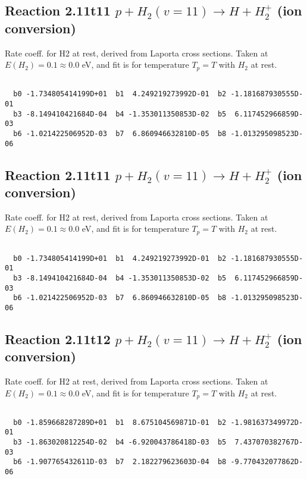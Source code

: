 \newpage
\subsection{
Reaction 2.11t11
$ p + H_2(v=11) \rightarrow H + H_2^+$ (ion conversion)
}
Rate coeff. for H2 at rest, derived from Laporta cross sections.
Taken at $E(H_2) = 0.1 \approx 0.0$ eV,  and fit is for temperature $T_p=T$ with $H_2$ at rest.

\begin{small}\begin{verbatim}

  b0 -1.734805414199D+01  b1  4.249219273992D-01  b2 -1.181687930555D-01
  b3 -8.149410421684D-04  b4 -1.353011350853D-02  b5  6.117452966859D-03
  b6 -1.021422506952D-03  b7  6.860946632810D-05  b8 -1.013295098523D-06

\end{verbatim}\end{small}

\newpage
\subsection{
Reaction 2.11t11
$ p + H_2(v=11) \rightarrow H + H_2^+$ (ion conversion)
}
Rate coeff. for H2 at rest, derived from Laporta cross sections.
Taken at $E(H_2) = 0.1 \approx 0.0$ eV,  and fit is for temperature $T_p=T$ with $H_2$ at rest.

\begin{small}\begin{verbatim}

  b0 -1.734805414199D+01  b1  4.249219273992D-01  b2 -1.181687930555D-01
  b3 -8.149410421684D-04  b4 -1.353011350853D-02  b5  6.117452966859D-03
  b6 -1.021422506952D-03  b7  6.860946632810D-05  b8 -1.013295098523D-06

\end{verbatim}\end{small}

\newpage
\subsection{
Reaction 2.11t12
$ p + H_2(v=11) \rightarrow H + H_2^+$ (ion conversion)
}
Rate coeff. for H2 at rest, derived from Laporta cross sections.
Taken at $E(H_2) = 0.1 \approx 0.0$ eV,  and fit is for temperature $T_p=T$ with $H_2$ at rest.

\begin{small}\begin{verbatim}

  b0 -1.859668287289D+01  b1  8.675104569871D-01  b2 -1.981637349972D-01
  b3 -1.863020812254D-02  b4 -6.920043786418D-03  b5  7.437070382767D-03
  b6 -1.907765432611D-03  b7  2.182279623603D-04  b8 -9.770432077862D-06

\end{verbatim}\end{small}

